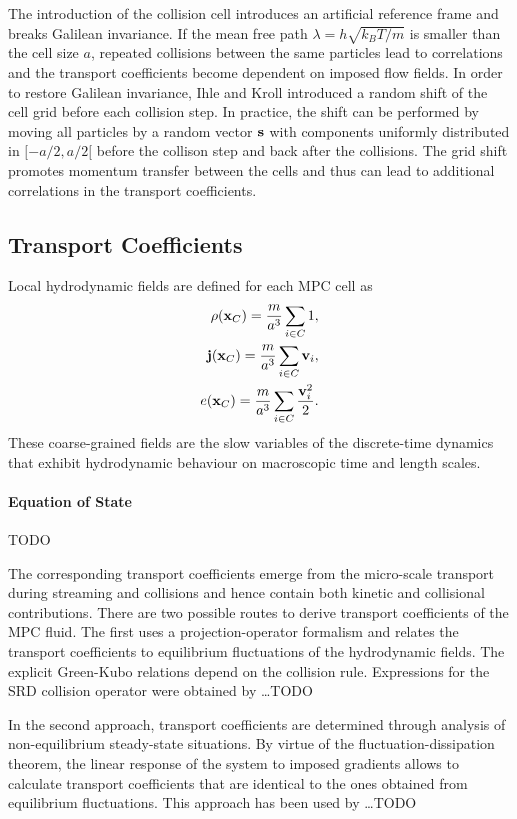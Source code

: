 \documentclass[8.5pt,twoside,twocolumn]{article}
\renewcommand{\vec}[1]{{\ensuremath{\mathchoice
                     {\mbox{\boldmath$\displaystyle\mathbf{#1}$}}
                     {\mbox{\boldmath$\textstyle\mathbf{#1}$}}
                     {\mbox{\boldmath$\scriptstyle\mathbf{#1}$}}
                     {\mbox{\boldmath$\scriptscriptstyle\mathbf{#1}$}}}}}%
\newcommand{\jvec}{\ensuremath{\vec{j}}}
\newcommand{\vvec}{\ensuremath{\vec{v}}}
\newcommand{\xvec}{\ensuremath{\vec{x}}}
\begin{document}
The introduction of the collision cell introduces an artificial reference frame and breaks Galilean invariance. If the mean free path $\lambda=h\sqrt{k_BT/m}$ is smaller than the cell size $a$, repeated collisions between the same particles lead to correlations and the transport coefficients become dependent on imposed flow fields. In order to restore Galilean invariance, Ihle and Kroll introduced a random shift of the cell grid before each collision step.\cite{Ihle2001,and21inGompper} In practice, the shift can be performed by moving all particles by a random vector $\vec{s}$ with components uniformly distributed in $[-a/2,a/2[$ before the collison step and back after the collisions. The grid shift promotes momentum transfer between the cells and thus can lead to additional correlations in the transport coefficients.\cite{someone}

\subsection{Transport Coefficients}

Local hydrodynamic fields are defined for each MPC cell as
%
\begin{align}
\rho(\xvec_C) = \frac{m}{a^3} \sum_{i\in C} 1 , \\
\jvec(\xvec_C) = \frac{m}{a^3} \sum_{i \in C} \vvec_i , \\
e(\xvec_C) = \frac{m}{a^3} \sum_{i \in C} \frac{\vvec_i^2}{2} .
\end{align}
%
These coarse-grained fields are the slow variables of the discrete-time dynamics that exhibit hydrodynamic behaviour on macroscopic time and length scales.

\paragraph{Equation of State} TODO

The corresponding transport coefficients emerge from the micro-scale transport during streaming and collisions and hence contain both kinetic and collisional contributions. There are two possible routes to derive transport coefficients of the MPC fluid. The first uses a projection-operator formalism and relates the transport coefficients to equilibrium fluctuations of the hydrodynamic fields. The explicit Green-Kubo relations depend on the collision rule. Expressions for the SRD collision operator were obtained by \dots TODO

In the second approach, transport coefficients are determined through analysis of non-equilibrium steady-state situations. By virtue of the fluctuation-dissipation theorem, the linear response of the system to imposed gradients allows to calculate transport coefficients that are identical to the ones obtained from equilibrium fluctuations. This approach has been used by \dots TODO
\end{document}
